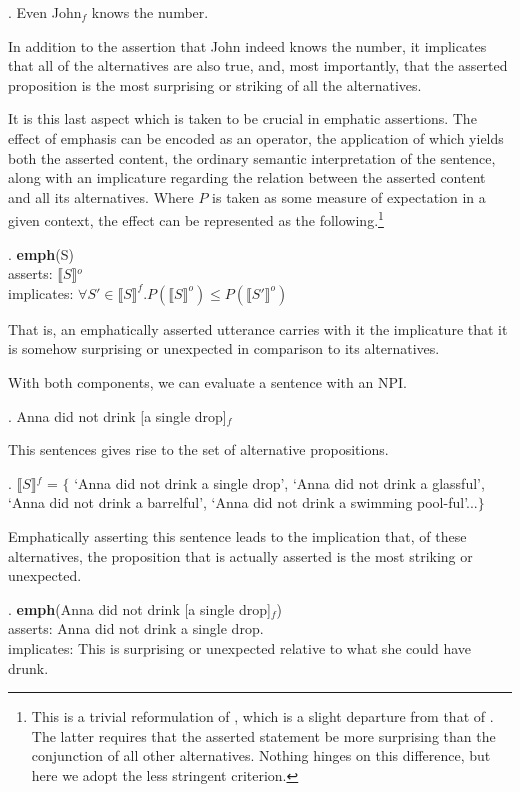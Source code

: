 \documentclass[12pt]{article}
\theoremstyle{definition} \newtheorem{definition}{Definition}
\newcommand{\inter}[1]{\ensuremath{\llbracket#1\rrbracket}}
\begin{document}
\ex. Even John$_f$ knows the number.

In addition to the assertion that John indeed knows the number, it implicates that all of the alternatives are also true, and, most importantly, that the asserted proposition is the most surprising or striking of all the alternatives.

It is this last aspect which is taken to be crucial in emphatic assertions. The effect of emphasis can be encoded as an operator, the application of which yields both the asserted content, the ordinary semantic interpretation of the sentence, along with an implicature regarding the relation between the asserted content and all its alternatives. Where $P$ is taken as some measure of expectation in a given context, the effect can be represented as the following.\footnote{This is a trivial reformulation of \cite{eckardt2006}, which is a slight departure from that of \cite{krifka1995polarity}. The latter requires that the asserted statement be more surprising than the conjunction of all other alternatives. Nothing hinges on this difference, but here we adopt the less stringent criterion.}

\ex. \textbf{emph}(S) \\ asserts: \inter{S}$^o$ \\ implicates: $\forall S' \in \inter{S}^f . P(\inter{S}^o) \leq P(\inter{S'}^o)$

That is, an emphatically asserted utterance carries with it the implicature that it is somehow surprising or unexpected in comparison to its alternatives.

With both components, we can evaluate a sentence with an NPI.

\ex. Anna did not drink [a single drop]$_f$

This sentences gives rise to the set of alternative propositions.

\ex. \inter{S}$^f$ = $\{$ `Anna did not drink a single drop', `Anna did not drink a glassful', `Anna did not drink a barrelful', `Anna did not drink a swimming pool-ful'...$\}$

Emphatically asserting this sentence leads to the implication that, of these alternatives, the proposition that is actually asserted is the most striking or unexpected.

\ex. \textbf{emph}(Anna did not drink [a single drop]$_f$) \\ asserts: Anna did not drink a single drop. \\ implicates: This is surprising or unexpected relative to what she could have drunk.
\end{document}
